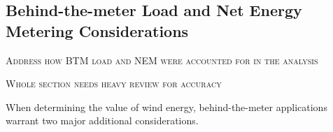 
\subsection{Behind-the-meter Load and Net Energy Metering Considerations}
\label{btm_cons}

\vspace*{10mm}
\begin{centering}
\textsc{Address how BTM load and NEM were accounted for in the analysis}
\end{centering}
\vspace*{10mm}

\vspace*{10mm}
\begin{centering}
\textsc{Whole section needs heavy review for accuracy}
\end{centering}
\vspace*{10mm}

When determining the value of wind energy, behind-the-meter applications warrant two major additional considerations. 


